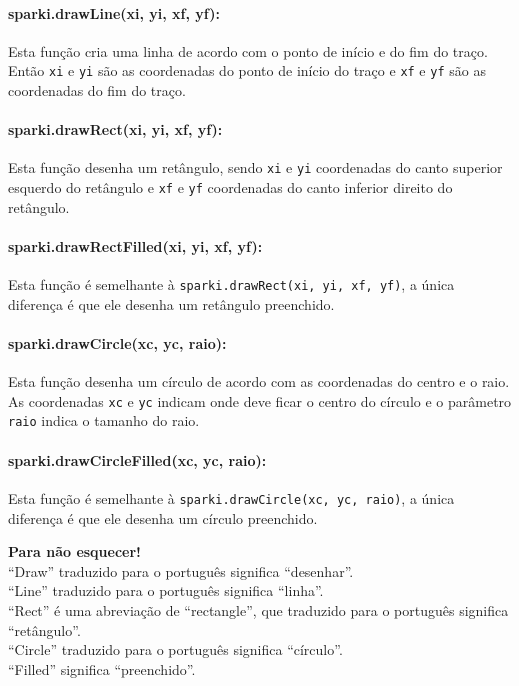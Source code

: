 \paragraph{sparki.drawLine(xi, yi, xf, yf):} 
Esta função cria uma linha de acordo com o ponto de início e do fim do traço. Então \lstinline[columns=fixed]{xi} e \lstinline[columns=fixed]{yi} são as coordenadas do ponto de início do traço e \lstinline[columns=fixed]{xf} e \lstinline[columns=fixed]{yf} são as coordenadas do fim do traço.

\paragraph{sparki.drawRect(xi, yi, xf, yf):}
Esta função desenha um retângulo, sendo \lstinline[columns=fixed]{xi} e \lstinline[columns=fixed]{yi} coordenadas do canto superior esquerdo do retângulo e \lstinline[columns=fixed]{xf} e \lstinline[columns=fixed]{yf} coordenadas do canto inferior direito do retângulo.

\paragraph{sparki.drawRectFilled(xi, yi, xf, yf):}
Esta função é semelhante à \lstinline[columns=fixed]{sparki.drawRect(xi, yi, xf, yf)}, a única diferença é que ele desenha um retângulo preenchido.
 
\paragraph{sparki.drawCircle(xc, yc, raio):}
Esta função desenha um círculo de acordo com as coordenadas do centro e o raio. As coordenadas \lstinline[columns=fixed]{xc} e \lstinline[columns=fixed]{yc} indicam onde deve ficar o centro do círculo e o parâmetro \lstinline[columns=fixed]{raio} indica o tamanho do raio.
 
\paragraph{sparki.drawCircleFilled(xc, yc, raio):}
Esta função é semelhante à \lstinline[columns=fixed]{sparki.drawCircle(xc, yc, raio)}, a única diferença é que ele desenha um círculo preenchido.

\begin{center}
    \textcolor{mydarkblue}{\textbf{Para não esquecer!}} 
    \\ ``Draw'' traduzido para o português significa ``desenhar''.
    \\ ``Line'' traduzido para o português significa ``linha''.
    \\ ``Rect'' é uma abreviação de ``rectangle'', que traduzido para o português significa ``retângulo''.
    \\ ``Circle'' traduzido para o português significa ``círculo''.
    \\ ``Filled'' significa ``preenchido''.
\end{center}


